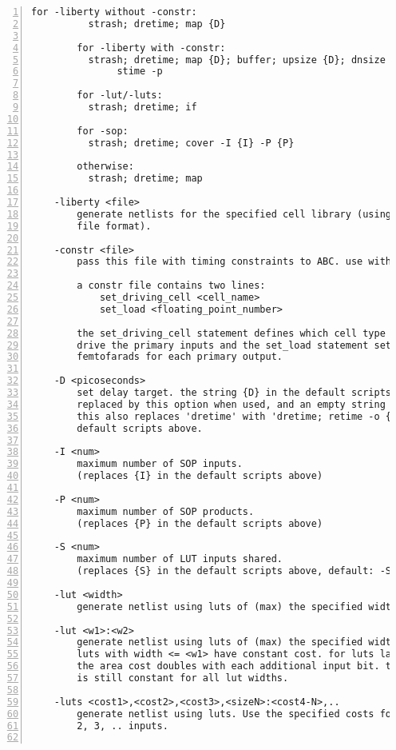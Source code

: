 \begin{lstlisting}[numbers=left,frame=single]
        for -liberty without -constr:
          strash; dretime; map {D}

        for -liberty with -constr:
          strash; dretime; map {D}; buffer; upsize {D}; dnsize {D};
               stime -p

        for -lut/-luts:
          strash; dretime; if

        for -sop:
          strash; dretime; cover -I {I} -P {P}

        otherwise:
          strash; dretime; map

    -liberty <file>
        generate netlists for the specified cell library (using the liberty
        file format).

    -constr <file>
        pass this file with timing constraints to ABC. use with -liberty.

        a constr file contains two lines:
            set_driving_cell <cell_name>
            set_load <floating_point_number>

        the set_driving_cell statement defines which cell type is assumed to
        drive the primary inputs and the set_load statement sets the load in
        femtofarads for each primary output.

    -D <picoseconds>
        set delay target. the string {D} in the default scripts above is
        replaced by this option when used, and an empty string otherwise.
        this also replaces 'dretime' with 'dretime; retime -o {D}' in the
        default scripts above.

    -I <num>
        maximum number of SOP inputs.
        (replaces {I} in the default scripts above)

    -P <num>
        maximum number of SOP products.
        (replaces {P} in the default scripts above)

    -S <num>
        maximum number of LUT inputs shared.
        (replaces {S} in the default scripts above, default: -S 1)

    -lut <width>
        generate netlist using luts of (max) the specified width.

    -lut <w1>:<w2>
        generate netlist using luts of (max) the specified width <w2>. All
        luts with width <= <w1> have constant cost. for luts larger than <w1>
        the area cost doubles with each additional input bit. the delay cost
        is still constant for all lut widths.

    -luts <cost1>,<cost2>,<cost3>,<sizeN>:<cost4-N>,..
        generate netlist using luts. Use the specified costs for luts with 1,
        2, 3, .. inputs.


\end{lstlisting}
